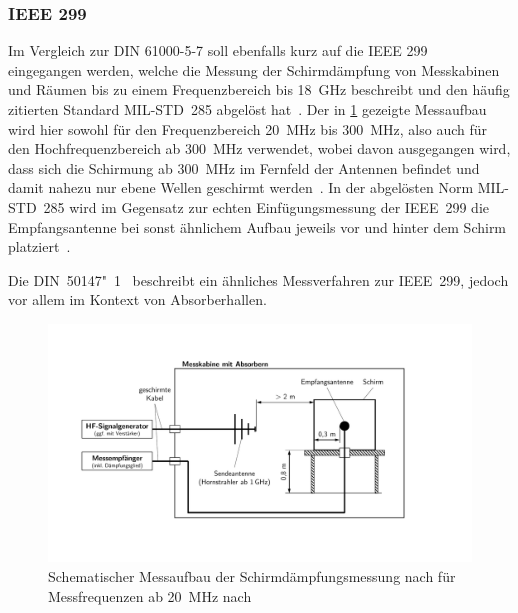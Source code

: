 \subsubsection{IEEE 299}
Im Vergleich zur DIN 61000-5-7 soll ebenfalls kurz auf die IEEE 299~\cite{IEEE_299} eingegangen werden, welche die Messung der Schirmdämpfung von Messkabinen und Räumen bis zu einem Frequenzbereich bis \SI{18}{\giga\hertz} beschreibt und den häufig zitierten Standard MIL-STD~285 abgelöst hat~\cite{EM_Schirmung}. Der in \Abb\ref{fig:2_Schematik-Schirmdaempfungsmessung_IEEE_299} gezeigte Messaufbau wird hier sowohl für den Frequenzbereich \SI{20}{\mega\hertz} bis \SI{300}{\mega\hertz}, also auch für den Hochfrequenzbereich ab \SI{300}{\mega\hertz} verwendet, wobei davon ausgegangen wird, dass sich die Schirmung ab \SI{300}{\mega\hertz} im Fernfeld der Antennen befindet und damit nahezu nur ebene Wellen geschirmt werden~\cite{EM_Schirmung, IEEE_299}. In der abgelösten Norm MIL-STD~285 wird im Gegensatz zur echten Einfügungsmessung der IEEE~299 die Empfangsantenne bei sonst ähnlichem Aufbau jeweils vor und hinter dem Schirm platziert~\cite{EM_Schirmung}.
\par
\vspace{\linespace}
Die DIN~50147"~1~\cite{DIN_EN_50147-1} beschreibt ein ähnliches Messverfahren zur IEEE~299, jedoch vor allem im Kontext von Absorberhallen.  

\begin{figure}[ht]
    \centering
    \includegraphics[page = 2, trim = 2cm 3cm 4cm 3cm, clip, width=.9\textwidth]{Abbildungen/Kapitel2/Schematiken_Schirmdaempfungsmessung.pdf}
    \caption[Schematischer Messaufbau der Schirmdämpfungsmessung nach \citeauthor{IEEE_299} für Messfrequenzen ab \SI{20}{\mega\hertz}]{Schematischer Messaufbau der Schirmdämpfungsmessung nach \citeauthor{IEEE_299} für Messfrequenzen ab \SI{20}{\mega\hertz} nach~\cite{IEEE_299}}
    \label{fig:2_Schematik-Schirmdaempfungsmessung_IEEE_299}
\end{figure}


